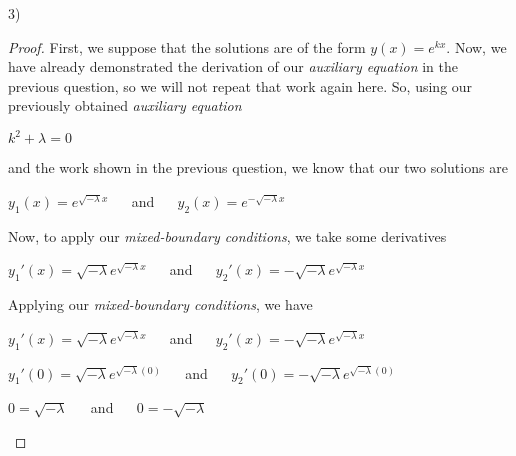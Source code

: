 \documentclass[executivepaper]{article}
\begin{document}
\begin{flushleft}

3)

\begin{proof}

First, we suppose that the solutions are of the form $y(x)=e^{kx}$. Now, we have already demonstrated the derivation of our \textit{auxiliary equation} in the previous question, so we will not repeat that work again here. So, using our previously obtained \textit{auxiliary equation}

\begin{center}

$k^2+\lambda=0$

\end{center}

and the work shown in the previous question, we know that our two solutions are

\begin{center}

$y_{1}(x)=e^{\sqrt{-\lambda} x}$ $\quad$ and $\quad$ $y_{2}(x)=e^{-\sqrt{-\lambda} x}$

\end{center}

Now, to apply our \textit{mixed-boundary conditions}, we take some derivatives

\begin{center}

$y_{1}'(x)=\sqrt{-\lambda} e^{\sqrt{-\lambda} x}$ $\quad$ and $\quad$ $y_{2}'(x)=-\sqrt{-\lambda} e^{\sqrt{-\lambda} x}$

\end{center}

Applying our \textit{mixed-boundary conditions}, we have

\begin{center}

$y_{1}'(x)=\sqrt{-\lambda} e^{\sqrt{-\lambda} x}$ $\quad$ and $\quad$ $y_{2}'(x)=-\sqrt{-\lambda} e^{\sqrt{-\lambda} x}$

\vspace{2mm}

$y_{1}'(0)=\sqrt{-\lambda} e^{\sqrt{-\lambda} (0)}$ $\quad$ and $\quad$ $y_{2}'(0)=-\sqrt{-\lambda} e^{\sqrt{-\lambda} (0)}$

\vspace{2mm}

$0=\sqrt{-\lambda}$ $\quad$ and $\quad$ $0=-\sqrt{-\lambda}$

\end{center}


\end{proof}
\end{flushleft}
\end{document}
